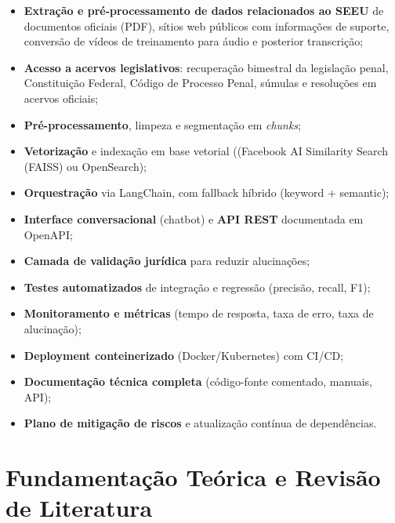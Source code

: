 \begin{itemize}[label=\textbullet]
  \item \textbf{Extração e pré-processamento de dados relacionados ao SEEU} de
        documentos oficiais (PDF), sítios web públicos com informações de
        suporte, conversão de vídeos de treinamento para áudio e posterior
        transcrição;
  \item \textbf{Acesso a acervos legislativos}: recuperação bimestral da
        legislação penal, Constituição Federal, Código de Processo Penal,
        súmulas e resoluções em acervos oficiais;
  \item \textbf{Pré-processamento}, limpeza e segmentação em \emph{chunks};
  \item \textbf{Vetorização} e indexação em base vetorial ((Facebook AI Similarity Search (FAISS) ou
        OpenSearch);
  \item \textbf{Orquestração} via LangChain, com fallback híbrido (keyword + semantic);
  \item \textbf{Interface conversacional} (chatbot) e \textbf{API REST}
        documentada em OpenAPI;
  \item \textbf{Camada de validação jurídica} para reduzir alucinações;
  \item \textbf{Testes automatizados} de integração e regressão (precisão, recall, F1);
  \item \textbf{Monitoramento e métricas} (tempo de resposta, taxa de erro, taxa de alucinação);
  \item \textbf{Deployment conteinerizado} (Docker/Kubernetes) com CI/CD;
  \item \textbf{Documentação técnica completa} (código-fonte comentado, manuais, API);
  \item \textbf{Plano de mitigação de riscos} e atualização contínua de dependências.
\end{itemize}




\chapter{Fundamentação Teórica e Revisão de Literatura}
\label{chap:fundamentacao_literatura}

